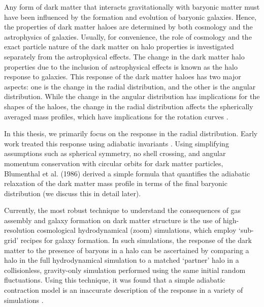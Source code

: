 Any form of dark matter that interacts gravitationally with baryonic matter must have been influenced by the formation and evolution of baryonic galaxies. Hence, the properties of dark matter haloes are determined by both cosmology and the astrophysics of galaxies. Usually, for convenience, the role of cosmology and the exact particle nature of the dark matter on halo properties is investigated separately from the astrophysical effects. The change in the dark matter halo properties due to the inclusion of astrophysical effects is known as the halo response to galaxies. This response of the dark matter haloes has two major aspects: one is the change in the radial distribution, and the other is the angular distribution. While the change in the angular distribution has implications for the shapes of the haloes, the change in the radial distribution affects the spherically averaged mass profiles, which have implications for the rotation curves \citep[][]{2004ApJ...616...16G,2006PhRvD..74l3522G,2010MNRAS.402..776P,2010MNRAS.406..922T,2010MNRAS.405.2161D,2010MNRAS.407..435A,2011MNRAS.414..195T,2016MNRAS.461.2658D,2019A&A...622A.197A,2022MNRAS.511.3910F,2023Velmani&Paranjape}.

In this thesis, we primarily focus on the response in the radial distribution. Early work treated this response using adiabatic invariants \citep[][]{osti6457593,1984MNRAS.211..753B,1986ApJ...301...27B,1987ApJ...318...15R}. Using simplifying assumptions such as spherical symmetry, no shell crossing, and angular momentum conservation with circular orbits for dark matter particles, Blumenthal et al. (1986) \citep[][]{1986ApJ...301...27B} derived a simple formula that quantifies the adiabatic relaxation of the dark matter mass profile in terms of the final baryonic distribution (we discuss this in detail later).

Currently, the most robust technique to understand the consequences of gas assembly and galaxy formation on dark matter structure is the use of high-resolution cosmological hydrodynamical (zoom) simulations, which employ `sub-grid' recipes for galaxy formation. In such simulations, the response of the dark matter to the presence of baryons in a halo can be ascertained by comparing a halo in the full hydrodynamical simulation to a matched `partner' halo in a collisionless, gravity-only simulation performed using the same initial random fluctuations. Using this technique, it was found that a simple adiabatic contraction model \citep[][]{1986ApJ...301...27B} is an inaccurate description of the response in a variety of simulations \citep[see, e.g.,][]{2004ApJ...616...16G,2006PhRvD..74l3522G,2010MNRAS.402..776P,2010MNRAS.406..922T,2010MNRAS.405.2161D,2010MNRAS.407..435A,2011MNRAS.414..195T,2016MNRAS.461.2658D,2019A&A...622A.197A,2022MNRAS.511.3910F}.

